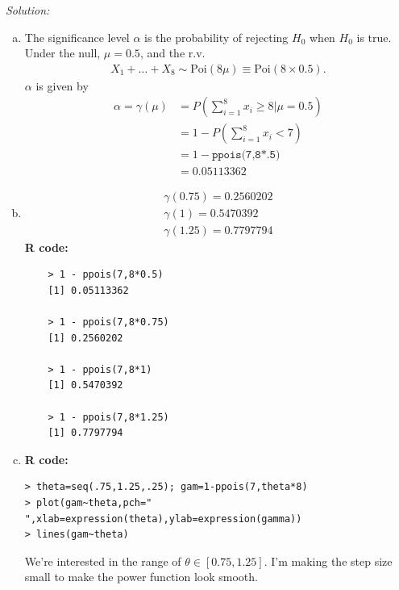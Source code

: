 \documentclass{book}
\theoremstyle{definition}
\newcommand{\nn}{\nonumber}
\newcommand{\al}{\alpha}
\newcommand{\lp}{\left(}
\newcommand{\rp}{\right)}
\begin{document}
\noindent \textit{Solution:} 
\begin{enumerate}[(a)]
	\item The significance level $\al$ is the probability of rejecting $H_0$ when $H_0$ is true. Under the null, $\mu = 0.5$, and the r.v.
	\begin{align}
	X_1 + \dots + X_8 \sim \text{Poi}(8\mu) \equiv \text{Poi}(8\times 0.5).
	\end{align}
	$\alpha$ is given by
	\begin{align}
	\alpha = \gamma(\mu)  &= P\lp \sum^8_{i=1} x_i \geq 8 \vert \mu = 0.5 \rp\nn\\
	&= 1 - P\lp \sum^8_{i=1}x_i < 7 \rp\nn\\
	&= \boxed{1 - \texttt{ppois(7,8*.5)}}\nn\\
	&= 0.05113362
	\end{align}
	
	\item 
	\begin{align}
	\gamma(0.75) = \boxed{0.2560202}\nn\\
	\gamma(1) = \boxed{0.5470392}\nn\\
	\gamma(1.25) = \boxed{0.7797794}
	\end{align}
	\textbf{R code:}
	\begin{lstlisting}
	> 1 - ppois(7,8*0.5)
	[1] 0.05113362
	
	> 1 - ppois(7,8*0.75)
	[1] 0.2560202
	
	> 1 - ppois(7,8*1)
	[1] 0.5470392
	
	> 1 - ppois(7,8*1.25)
	[1] 0.7797794
	\end{lstlisting}
	\item 	\textbf{R code:}
	\begin{lstlisting}
> theta=seq(.75,1.25,.25); gam=1-ppois(7,theta*8)
> plot(gam~theta,pch=" ",xlab=expression(theta),ylab=expression(gamma))
> lines(gam~theta)
	\end{lstlisting}
	We're interested in the range of $\theta \in [0.75, 1.25]$. I'm making the step size small to make the power function look smooth.\\
	
	
	

\end{enumerate}
\end{document}
